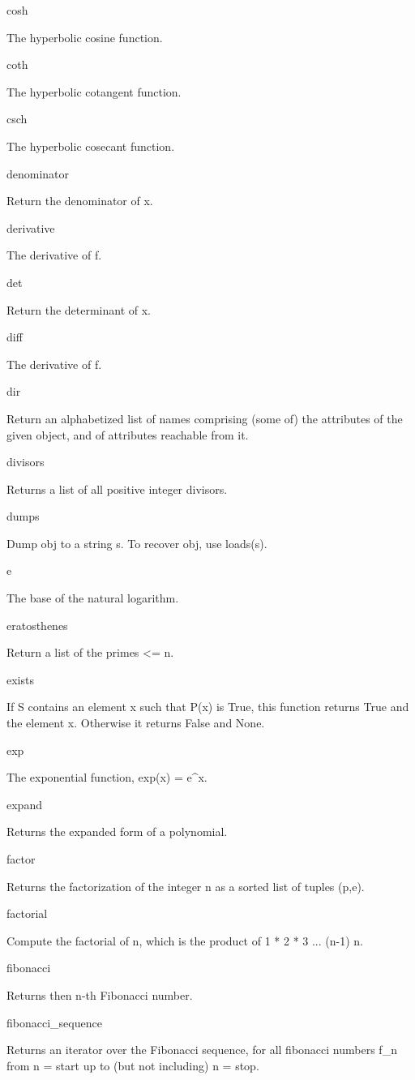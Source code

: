 \documentclass[12pt,oneside]{book}
\begin{document}
cosh

The hyperbolic cosine function.

coth

The hyperbolic cotangent function.

csch

The hyperbolic cosecant function.

denominator

Return the denominator of x.

derivative

The derivative of f.

det

Return the determinant of x.

diff

The derivative of f.

dir

Return an alphabetized list of names comprising (some of) the attributes of the given object, and of attributes reachable from it.

divisors

Returns a list of all positive integer divisors.

dumps

Dump obj to a string s. To recover obj, use loads(s).

e

The base of the natural logarithm.

eratosthenes

Return a list of the primes {\textless}= n.

exists

If S contains an element x such that P(x) is True, this function returns True and the element x. Otherwise it returns False and None.

exp

The exponential function, exp(x) = e\^{}x.

expand

Returns the expanded form of a polynomial.

factor

Returns the factorization of the integer n as a sorted list of tuples (p,e).

factorial

Compute the factorial of n, which is the product of 1 * 2 * 3 ... (n{}-1) n.

fibonacci

Returns then n{}-th Fibonacci number.

fibonacci\_sequence

Returns an iterator over the Fibonacci sequence, for all fibonacci numbers f\_n from n = start up to (but not including) n = stop.
\end{document}
